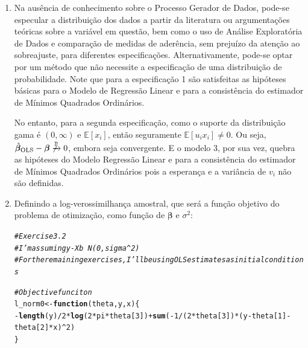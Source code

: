 \documentclass{homework}\usepackage[]{graphicx}\usepackage[]{color}
\makeatletter
\newcommand{\hlnum}[1]{\textcolor[rgb]{0.686,0.059,0.569}{#1}}%
\newcommand{\hlcom}[1]{\textcolor[rgb]{0.678,0.584,0.686}{\textit{#1}}}%
\newcommand{\hlopt}[1]{\textcolor[rgb]{0,0,0}{#1}}%
\newcommand{\hlstd}[1]{\textcolor[rgb]{0.345,0.345,0.345}{#1}}%
\newcommand{\hlkwa}[1]{\textcolor[rgb]{0.161,0.373,0.58}{\textbf{#1}}}%
\newcommand{\hlkwb}[1]{\textcolor[rgb]{0.69,0.353,0.396}{#1}}%
\newcommand{\hlkwc}[1]{\textcolor[rgb]{0.333,0.667,0.333}{#1}}%
\newcommand{\hlkwd}[1]{\textcolor[rgb]{0.737,0.353,0.396}{\textbf{#1}}}%
\newenvironment{kframe}{%
 \def\at@end@of@kframe{}%
 \ifinner\ifhmode%
  \def\at@end@of@kframe{\end{minipage}}%
  \begin{minipage}{\columnwidth}%
 \fi\fi%
 \def\FrameCommand##1{\hskip\@totalleftmargin \hskip-\fboxsep
 \colorbox{shadecolor}{##1}\hskip-\fboxsep
     \hskip-\linewidth \hskip-\@totalleftmargin \hskip\columnwidth}%
 \MakeFramed {\advance\hsize-\width
   \@totalleftmargin\z@ \linewidth\hsize
   \@setminipage}}%
 {\par\unskip\endMakeFramed%
 \at@end@of@kframe}
\newenvironment{knitrout}{}{} %
\makeatother
\begin{document}
\begin{enumerate}

\item Na ausência de conhecimento sobre o Processo Gerador de Dados, pode-se especular a distribuição dos dados a partir da literatura ou argumentações teóricas sobre a variável em questão, bem como o uso de Análise Exploratória de Dados e comparação de medidas de aderência, sem prejuízo da atenção ao sobreajuste, para diferentes especificações. Alternativamente, pode-se optar por um método que não necessite a especificação de uma distribuição de probabilidade. Note que para a especificação 1 são satisfeitas as hipóteses básicas para o Modelo de Regressão Linear e para a consistência do estimador de Mínimos Quadrados Ordinários.

No entanto, para a segunda especificação, como o suporte da distribuição gama é $\left(0,\infty\right)$ e $\mathbb{E}[x_i]$, então seguramente $\mathbb{E}[u_ix_i] \neq 0$. Ou seja, $\hat{\bm{\beta}}_{\mathrm{OLS}} - \bm{\beta} \not\xrightarrow{\mathbb{P}} 0$, embora seja convergente. E o modelo 3, por sua vez, quebra as hipóteses do Modelo Regressão Linear e para a consistência do estimador de Mínimos Quadrados Ordinários pois a esperança e a variância de $v_i$ não são definidas.

\item Definindo a log-verossimilhança amostral, que será a função objetivo do problema de otimização, como função de $\bm{\beta}$ e $\sigma^2$:

\begin{knitrout}
\color{fgcolor}\begin{kframe}
\begin{alltt}
\hlcom{# Exercise 3.2}
\hlcom{# I'm assuming y - Xb ~ N(0, sigma^2)}
\hlcom{# For the remaining exercises, I'll be using OLS estimates as initial conditions}

\hlcom{# Objective funciton}
\hlstd{l_norm0} \hlkwb{<-} \hlkwa{function}\hlstd{(}\hlkwc{theta}\hlstd{,} \hlkwc{y}\hlstd{,} \hlkwc{x}\hlstd{)\{}
  \hlopt{-}\hlkwd{length}\hlstd{(y)}\hlopt{/}\hlnum{2}\hlopt{*}\hlkwd{log}\hlstd{(}\hlnum{2}\hlopt{*}\hlstd{pi}\hlopt{*}\hlstd{theta[}\hlnum{3}\hlstd{])} \hlopt{+} \hlkwd{sum}\hlstd{(}\hlopt{-}\hlnum{1}\hlopt{/}\hlstd{(}\hlnum{2}\hlopt{*}\hlstd{theta[}\hlnum{3}\hlstd{])}\hlopt{*}\hlstd{(y} \hlopt{-} \hlstd{theta[}\hlnum{1}\hlstd{]} \hlopt{-} \hlstd{theta[}\hlnum{2}\hlstd{]}\hlopt{*}\hlstd{x)}\hlopt{^}\hlnum{2}\hlstd{)}
\hlstd{\}}
\end{alltt}
\end{kframe}
\end{knitrout}


\end{enumerate}
\end{document}
